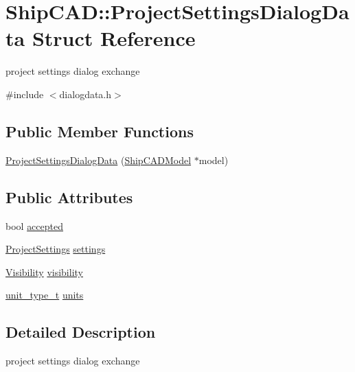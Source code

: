 \hypertarget{structShipCAD_1_1ProjectSettingsDialogData}{}\section{Ship\+C\+AD\+:\+:Project\+Settings\+Dialog\+Data Struct Reference}
\label{structShipCAD_1_1ProjectSettingsDialogData}


project settings dialog exchange  




{\ttfamily \#include $<$dialogdata.\+h$>$}

\subsection*{Public Member Functions}
\begin{DoxyCompactItemize}
\item 
\hyperlink{structShipCAD_1_1ProjectSettingsDialogData_a2c6cb4cc58e37313217d63dad35ba0c1}{Project\+Settings\+Dialog\+Data} (\hyperlink{classShipCAD_1_1ShipCADModel}{Ship\+C\+A\+D\+Model} $\ast$model)
\end{DoxyCompactItemize}
\subsection*{Public Attributes}
\begin{DoxyCompactItemize}
\item 
bool \hyperlink{structShipCAD_1_1ProjectSettingsDialogData_aff0488765c1046abba0e553540480495}{accepted}
\item 
\hyperlink{classShipCAD_1_1ProjectSettings}{Project\+Settings} \hyperlink{structShipCAD_1_1ProjectSettingsDialogData_ae6f280accdfe3f4d212a5f1eec023c16}{settings}
\item 
\hyperlink{classShipCAD_1_1Visibility}{Visibility} \hyperlink{structShipCAD_1_1ProjectSettingsDialogData_a97f37da0a44aaca11963ab6a3d7da218}{visibility}
\item 
\hyperlink{namespaceShipCAD_ac6a7a28b4b063771afae92decb602da5}{unit\+\_\+type\+\_\+t} \hyperlink{structShipCAD_1_1ProjectSettingsDialogData_a0c5b5a3e4f840c501ba4e19191050284}{units}
\end{DoxyCompactItemize}


\subsection{Detailed Description}
project settings dialog exchange 

